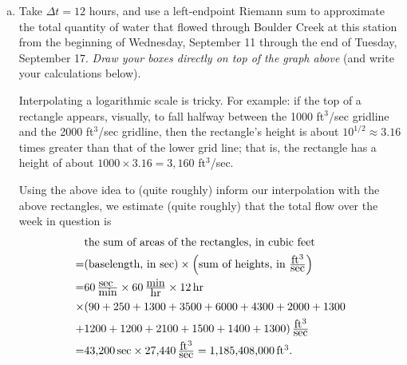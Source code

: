 \documentclass[12pt]{article}
\def\Red{\color{red}}
\def\Black{\color{black}}
\def\Red{\color{white}}
\def\Black{\color{black}}
\begin{document}
\begin{enumerate}[(a)]\addtocounter{enumi}{3}
\item Take $\Delta t = 12$ hours, and use a left-endpoint Riemann sum to approximate the total quantity of water that flowed through Boulder Creek at this station from the beginning of Wednesday, September 11 through the end of Tuesday, September 17. {\it Draw your boxes directly on top of the graph above}   (and write your calculations below).

\Red Interpolating a logarithmic scale is tricky.  For example:  if the top of a rectangle appears, visually, to fall halfway between the 1000 ft$^3$/sec gridline and the 2000 ft$^3$/sec gridline, then the   rectangle's  height is about $10^{1/2}\approx 3.16$ times greater than that of the lower grid line;  that is, the rectangle has a height of about $1000\times 3.16=3,160$ ft$^3$/sec.

Using the above idea to (quite roughly) inform our interpolation with the above rectangles, we estimate (quite roughly)  that the total flow  over the week in question is
\begin{align*}&\hbox{the sum of areas of the rectangles, in cubic feet}\\=&
\hbox{(baselength, in sec)} \times \Bigl(\hbox{sum of heights, in}\  {\textstyle \frac{\hbox{ft$^3$}}{\hbox{sec}}}\Bigr)\\=& 60\,  {\textstyle\frac{\hbox{sec }}{\hbox{min}}}\times 60\,  {\textstyle\frac{\hbox{min}}{\hbox{hr}}}\times12 \, \hbox{hr}\\\times &(90+250 +1300+3500+6000+4300+2000 + 1300\\+&1200+1200+2100+1500+1400+1300) \, {\textstyle\frac{\hbox{ft$^3$}}{\hbox{sec}}}
\\=& \hbox{43,200} \, \hbox{sec} \times \hbox{27,440}\, {\textstyle\frac{\hbox{ft$^3$}}{\hbox{sec}}}  =\hbox{1,185,408,000}\, \hbox{ft$^3$}.\end{align*} 

  \Black
\end{enumerate}\vfill\eject
 
\end{document}
